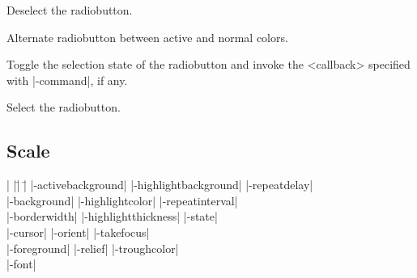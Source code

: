 \vskip5pt
\begin{enum}{1cm}

 Deselect the radiobutton. 

 Alternate radiobutton between 
active and normal colors.

 Toggle the selection state 
of the radiobutton and invoke the <callback> specified with |-command|, if any.

 Select the radiobutton.

\end{enum}

\subsection*{Scale}
\vspace{-4pt}

\begin{tabbing}
|                   |\=|                     |\= \kill
|-activebackground| \> |-highlightbackground| \> |-repeatdelay| \\  
|-background|       \> |-highlightcolor|     \> |-repeatinterval| \\ 
|-borderwidth|      \> |-highlightthickness| \> |-state| \\         
|-cursor|           \> |-orient|             \> |-takefocus| \\   
|-foreground|       \> |-relief| 	     \> |-troughcolor| \\   
|-font| \\
\end{tabbing}

